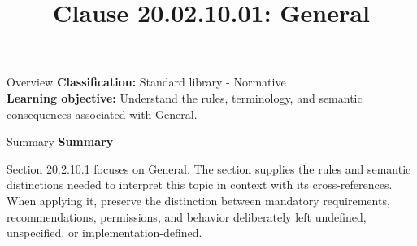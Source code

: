 \documentclass[10pt,letterpaper]{article}
\title{Clause 20.02.10.01: General}
\author{}
\date{}
\begin{document}
\maketitle
\begin{CornellOverviewBox}{Overview}
\textbf{Classification:} Standard library - Normative\\[2pt]
\textbf{Learning objective:} Understand the rules, terminology, and semantic consequences associated with General.
\end{CornellOverviewBox}\begin{CornellSummaryBox}{Summary}
{\sffamily\bfseries\color{Accent} Summary}\par\vspace{3pt}Section 20.2.10.1 focuses on General. The section supplies the rules and semantic distinctions needed to interpret this topic in context with its cross-references. When applying it, preserve the distinction between mandatory requirements, recommendations, permissions, and behavior deliberately left undefined, unspecified, or implementation-defined.
\end{CornellSummaryBox}
\end{document}
